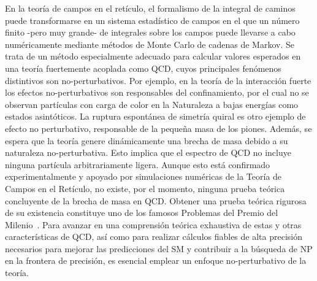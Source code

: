 En la teoría de campos en el retículo, el formalismo de la integral de caminos puede transformarse en un sistema estadístico de campos en el que un número finito -pero muy grande- de integrales sobre los campos puede llevarse a cabo numéricamente mediante métodos de Monte Carlo de cadenas de Markov. Se trata de un método especialmente adecuado para calcular valores esperados en una teoría fuertemente acoplada como QCD, cuyos principales fenómenos distintivos son no-perturbativos. Por ejemplo, en la teoría de la interacción fuerte los efectos no-perturbativos son responsables del confinamiento, por el cual no se observan partículas con carga de color en la Naturaleza a bajas energías como estados asintóticos. La ruptura espontánea de simetría quiral es otro ejemplo de efecto no perturbativo, responsable de la pequeña masa de los piones. Además, se espera que la teoría genere dinámicamente una brecha de masa debido a su naturaleza no-perturbativa. Esto implica que el espectro de QCD no incluye ninguna partícula arbitrariamente ligera. Aunque esto está confirmado experimentalmente y apoyado por simulaciones numéricas de la Teoría de Campos en el Retículo, no existe, por el momento, ninguna prueba teórica concluyente de la brecha de masa en QCD. Obtener una prueba teórica rigurosa de su existencia constituye uno de los famosos Problemas del Premio del Milenio~\citep{MillenniumPrizeproblems}. Para avanzar en una comprensión teórica exhaustiva de estas y otras características de QCD, así como para realizar cálculos fiables de alta precisión necesarios para mejorar las predicciones del SM y contribuir a la búsqueda de NP en la frontera de precisión, es esencial emplear un enfoque no-perturbativo de la teoría.

